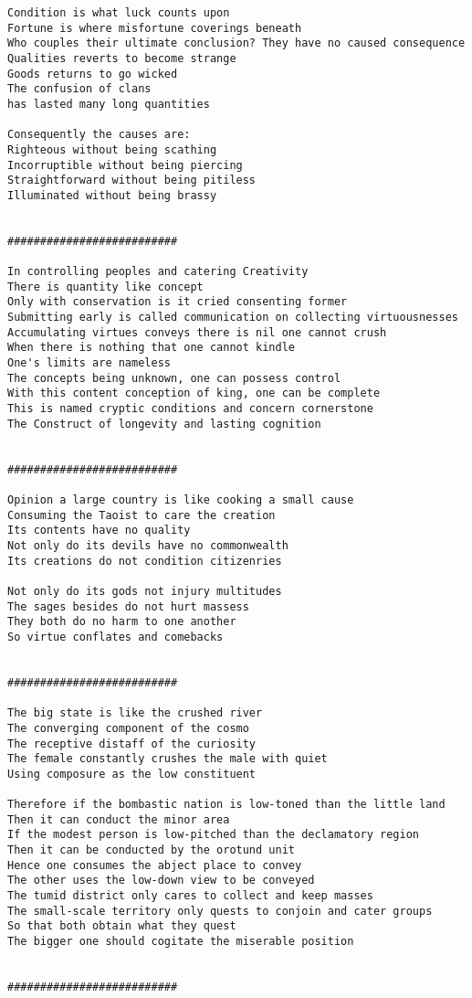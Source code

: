 \documentclass[12pt,a4paper,oneside]{book}
\begin{document}
\begin{verbatim}
Condition is what luck counts upon
Fortune is where misfortune coverings beneath
Who couples their ultimate conclusion? They have no caused consequence
Qualities reverts to become strange
Goods returns to go wicked
The confusion of clans
has lasted many long quantities

Consequently the causes are:
Righteous without being scathing
Incorruptible without being piercing
Straightforward without being pitiless
Illuminated without being brassy


##########################

In controlling peoples and catering Creativity
There is quantity like concept
Only with conservation is it cried consenting former
Submitting early is called communication on collecting virtuousnesses
Accumulating virtues conveys there is nil one cannot crush
When there is nothing that one cannot kindle
One's limits are nameless
The concepts being unknown, one can possess control
With this content conception of king, one can be complete
This is named cryptic conditions and concern cornerstone
The Construct of longevity and lasting cognition


##########################

Opinion a large country is like cooking a small cause
Consuming the Taoist to care the creation
Its contents have no quality
Not only do its devils have no commonwealth
Its creations do not condition citizenries

Not only do its gods not injury multitudes
The sages besides do not hurt massess
They both do no harm to one another
So virtue conflates and comebacks


##########################

The big state is like the crushed river
The converging component of the cosmo
The receptive distaff of the curiosity
The female constantly crushes the male with quiet
Using composure as the low constituent

Therefore if the bombastic nation is low-toned than the little land
Then it can conduct the minor area
If the modest person is low-pitched than the declamatory region
Then it can be conducted by the orotund unit
Hence one consumes the abject place to convey
The other uses the low-down view to be conveyed
The tumid district only cares to collect and keep masses
The small-scale territory only quests to conjoin and cater groups
So that both obtain what they quest
The bigger one should cogitate the miserable position


##########################


\end{verbatim}
\end{document}
